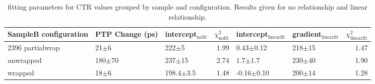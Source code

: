 \begin{table}
\caption{\label{tab:ctrfit-20-results} fitting parameters for CTR values grouped by sample and configuration. Results given for no relationship and linear relationship.}
\begin{tabular}{lllrllr}
\hline
SampleB configuration & PTP Change (ps) & intercept$_\text{nofit}$ &  $\chi^2_\text{nofit}$ & intercept$_\text{linearfit}$ & gradient$_\text{linearfit}$ &  $\chi^2_\text{linearfit}$ \\
\hline
2396    partialwrap   &           21$\pm$6 &       222$\pm$5 &                   1.99 &       0.43$\pm$0.12 &         218$\pm$15 &                    1.47 \\
        unwrapped     &          180$\pm$70 &     237$\pm$15 &                  2.74 &       1.7$\pm$1.7  &         230$\pm$40 &                    1.90 \\
        wrapped       &           18$\pm$6 &   198.4$\pm$3.5 &                   1.48 &      -0.16$\pm$0.10 &         200$\pm$14 &                    1.28 \\
\hline
\end{tabular}
\end{table}